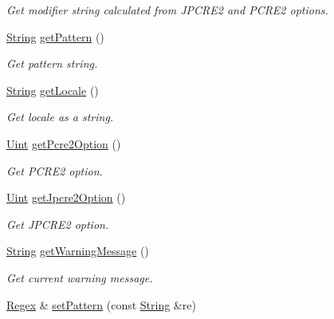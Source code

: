 \begin{DoxyCompactItemize}
\begin{DoxyCompactList}\small\item\em Get modifier string calculated from J\+P\+C\+R\+E2 and P\+C\+R\+E2 options. \end{DoxyCompactList}\item 
\hyperlink{namespacejpcre2_a91f03070152fb228bc116c5a737f1d16}{String} \hyperlink{classjpcre2_1_1Regex_a006dd17f71a2d717aa9575d72fac6d7b_a006dd17f71a2d717aa9575d72fac6d7b}{get\+Pattern} ()
\begin{DoxyCompactList}\small\item\em Get pattern string. \end{DoxyCompactList}\item 
\hyperlink{namespacejpcre2_a91f03070152fb228bc116c5a737f1d16}{String} \hyperlink{classjpcre2_1_1Regex_ae9afaf627ed922a9e4cee8074d30edfa_ae9afaf627ed922a9e4cee8074d30edfa}{get\+Locale} ()
\begin{DoxyCompactList}\small\item\em Get locale as a string. \end{DoxyCompactList}\item 
\hyperlink{namespacejpcre2_a078242d38221a13fb3543b9edd78c099}{Uint} \hyperlink{classjpcre2_1_1Regex_a857307fc59ba7f010b097e61c1744923_a857307fc59ba7f010b097e61c1744923}{get\+Pcre2\+Option} ()
\begin{DoxyCompactList}\small\item\em Get P\+C\+R\+E2 option. \end{DoxyCompactList}\item 
\hyperlink{namespacejpcre2_a078242d38221a13fb3543b9edd78c099}{Uint} \hyperlink{classjpcre2_1_1Regex_a5d2d04eb7c393338a4c8cce941e957ef_a5d2d04eb7c393338a4c8cce941e957ef}{get\+Jpcre2\+Option} ()
\begin{DoxyCompactList}\small\item\em Get J\+P\+C\+R\+E2 option. \end{DoxyCompactList}\item 
\hyperlink{namespacejpcre2_a91f03070152fb228bc116c5a737f1d16}{String} \hyperlink{classjpcre2_1_1Regex_a1a639ae4090b88609c03e9268faf02d8_a1a639ae4090b88609c03e9268faf02d8}{get\+Warning\+Message} ()
\begin{DoxyCompactList}\small\item\em Get current warning message. \end{DoxyCompactList}\item 
\hyperlink{classjpcre2_1_1Regex}{Regex} \& \hyperlink{classjpcre2_1_1Regex_a85d9a514ea86ae68533223adac6c6bd8_a85d9a514ea86ae68533223adac6c6bd8}{set\+Pattern} (const \hyperlink{namespacejpcre2_a91f03070152fb228bc116c5a737f1d16}{String} \&re)

\end{DoxyCompactItemize}
